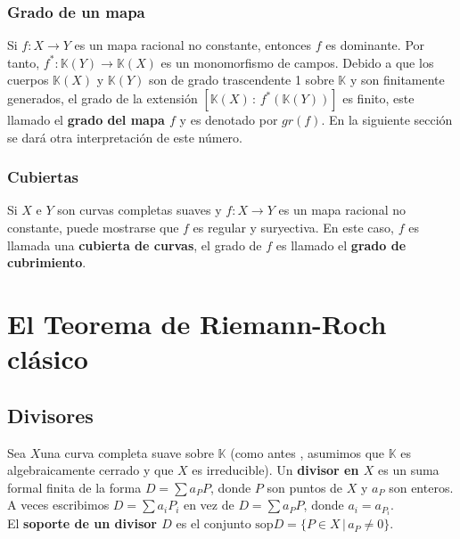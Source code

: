 \documentclass[12pt,a4paper]{report}
\newcommand{\sop}{\mbox{sop}}
\newcommand{\K}{\mathbb{K}}
\begin{document}
\subsection{Grado de un mapa}
Si $f:X \rightarrow Y$ es un mapa racional no constante, entonces $f$ es dominante. Por tanto, $f^{*}: \K(Y) \rightarrow \K(X)$ es un monomorfismo de campos. Debido a que los cuerpos $\K(X)$ y $\K(Y)$ son de grado trascendente 1 sobre $\K$ y son finitamente generados, el grado de la extensión $[ \K(X) \, : \, f^{*}(\K(Y)) ] $ es finito, este llamado el \textbf{grado del mapa $f$} y es denotado por $gr(f)$. En la siguiente sección se dará otra interpretación de este número.

\subsection{Cubiertas}
Si $X$ e $Y$ son curvas completas suaves y $f: X \rightarrow Y$ es un mapa racional no constante, puede mostrarse que $f$ es regular y suryectiva. En este caso, $f$ es llamada una \textbf{cubierta de curvas}, el grado de $f$ es llamado el \textbf{grado de cubrimiento}.

\chapter{El Teorema de Riemann-Roch clásico}

\section{Divisores}
Sea $X$una curva completa suave sobre $\K$ (como antes , asumimos que $\K$ es algebraicamente cerrado y que $X$ es irreducible). Un \textbf{divisor en $X$} es un suma formal finita de la forma $D=\sum a_{P}P$, donde $P$ son puntos de $X$ y $a_{P}$ son enteros.\\
A veces escribimos $D= \sum a_{i}P_{i}$ en vez de $D=\sum a_{P}P$, donde $a_{i}=a_{P_{i}}$.\\

El \textbf{soporte de un divisor $D$} es el conjunto $\sop D = \{ P \in X \, |\, a_{P}\neq 0 \}$. \\
\end{document}
